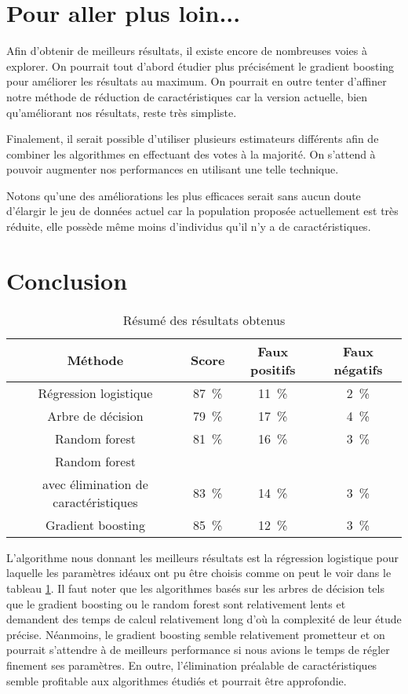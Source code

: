 \documentclass[11pt,a4paper]{article}
\begin{document}
\section{Pour aller plus loin...}
	Afin d'obtenir de meilleurs résultats, il existe encore de nombreuses voies à explorer. On pourrait tout d'abord étudier plus précisément le gradient boosting pour améliorer les résultats au maximum. On pourrait en outre tenter d'affiner notre méthode de réduction de caractéristiques car la version actuelle, bien qu'améliorant nos résultats, reste très simpliste.

	Finalement, il serait possible d'utiliser plusieurs estimateurs différents afin de combiner les algorithmes en effectuant des votes à la majorité. On s'attend à pouvoir augmenter nos performances en utilisant une telle technique.

	Notons qu'une des améliorations les plus efficaces serait sans aucun doute d'élargir le jeu de données actuel car la population proposée actuellement est très réduite, elle possède même moins d'individus qu'il n'y a de caractéristiques.

\section{Conclusion}
	\begin{table}
	\begin{center}
	\begin{tabular}{cccc}
		\toprule
		Méthode  &	Score  &	Faux positifs  &	Faux négatifs \\
		\midrule
		Régression logistique 	& \SI{87}{\percent} 	 &	\SI{11}{\percent}  	& \SI{2}{\percent} \\
		Arbre de décision & \SI{79}{\percent} & \SI{17}{\percent} & \SI{4}{\percent} \\
		Random forest & \SI{81}{\percent} & \SI{16}{\percent} & \SI{3}{\percent} \\
		Random forest \\ avec élimination de caractéristiques& \SI{83}{\percent} & \SI{14}{\percent} & \SI{3}{\percent} \\
		Gradient boosting & \SI{85}{\percent} & \SI{12}{\percent} & \SI{3}{\percent} \\
		\bottomrule
	\end{tabular}
	\caption{Résumé des résultats obtenus \label{table:results}}
	\end{center}
\end{table}

	L'algorithme nous donnant les meilleurs résultats est la régression logistique pour laquelle les paramètres idéaux ont pu être choisis comme on peut le voir dans le tableau \ref{table:results}.
	Il faut noter que les algorithmes basés sur les arbres de décision tels que le gradient boosting ou le random forest sont relativement lents et demandent des temps de calcul relativement long d'où la complexité de leur étude précise. Néanmoins, le gradient boosting semble relativement prometteur et on pourrait s'attendre à de meilleurs performance si nous avions le temps de régler finement ses paramètres. En outre, l'élimination préalable de caractéristiques semble profitable aux algorithmes étudiés et pourrait être approfondie.
\end{document}
